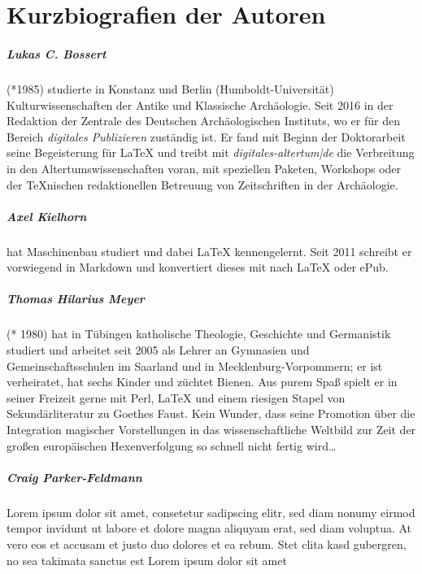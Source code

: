 
\chapter{Kurzbiografien der Autoren}

\paragraph{Lukas C. Bossert} (*1985) studierte in Konstanz und Berlin (Humboldt-Universität) Kulturwissenschaften der Antike und Klassische Archäologie. Seit 2016 in der Redaktion der Zentrale des Deutschen Archäologischen Instituts, wo er für den Bereich \emph{digitales Publizieren} zuständig ist.
Er fand mit Beginn der Doktorarbeit seine Begeisterung für \LaTeX{} und treibt mit \emph{digitales-altertum|de} die Verbreitung in den  Altertumswissenschaften voran, mit speziellen Paketen, Workshops oder der \TeX nischen redaktionellen Betreuung von Zeitschriften in der Archäologie.

\paragraph{Axel Kielhorn} hat Maschinenbau studiert und dabei \LaTeX{} kennengelernt. 
Seit 2011 schreibt er vorwiegend in Markdown und konvertiert dieses mit  nach \LaTeX{} oder ePub.

\paragraph{Thomas Hilarius Meyer} (* 1980) hat in Tübingen katholische Theologie, Geschichte und Germanistik studiert und arbeitet seit 2005 als Lehrer an Gymnasien und Gemeinschaftsschulen im Saarland und in Mecklenburg-Vorpommern; er ist verheiratet, hat sechs Kinder und züchtet Bienen.
Aus purem Spaß spielt er in seiner Freizeit gerne mit Perl, \LaTeX{} und einem riesigen Stapel von Sekundärliteratur zu Goethes Faust. Kein Wunder, dass seine Promotion über die Integration magischer Vorstellungen in das wissenschaftliche Weltbild zur Zeit der großen europäischen Hexenverfolgung so schnell nicht fertig wird\ldots

\paragraph{Craig Parker-Feldmann} Lorem ipsum dolor sit amet, consetetur sadipscing elitr, sed diam nonumy eirmod tempor invidunt ut labore et dolore magna aliquyam erat, sed diam voluptua. At vero eos et accusam et justo duo dolores et ea rebum. Stet clita kasd gubergren, no sea takimata sanctus est Lorem ipsum dolor sit amet

